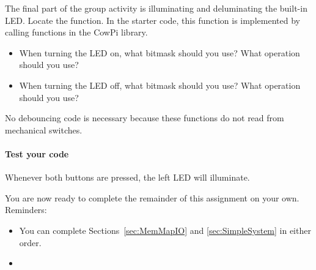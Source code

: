 The final part of the group activity is illuminating and deluminating the built-in LED\@.
Locate the  function.
In the starter code, this function is implemented by calling functions in the CowPi library.

\begin{description}
        \begin{description}
                \begin{itemize}
                    \item When turning the LED on, what bitmask should you use?
                    What operation should you use?
                    \item When turning the LED off, what bitmask should you use?
                    What operation should you use?
                \end{itemize}
            \item[\phantom{xxx}$\bullet$] No debouncing code is necessary because these functions do not read from mechanical switches.
        \end{description}
\end{description}

\paragraph{Test your code}

\begin{description}
\end{description}
Whenever both buttons are pressed, the left LED will illuminate.


\vspace{1cm}

You are now ready to complete the remainder of this assignment on your own.
Reminders:
\begin{itemize}
    \item You can complete Sections~\ref{sec:MemMapIO} and \ref{sec:SimpleSystem} in either order.
    \item \collaborationrules
\end{itemize}
